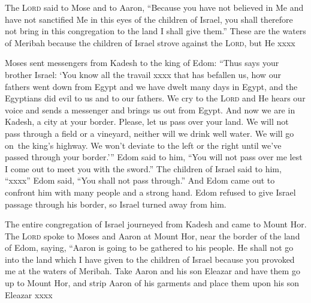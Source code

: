 \begin{inparaenum}
     The \textsc{Lord} said to Mose and to Aaron, ``Because you have not believed in Me and have not sanctified Me in this eyes of the children of Israel, you shall therefore not bring in this congregation to the land I shall give them.''%
     These are the waters of Meribah because the children of Israel strove against the \textsc{Lord}, but He xxxx%
    
     Moses sent messengers from Kadesh to the king of Edom: ``Thus says your brother Israel: `You know all the travail xxxx that has befallen us,%
     how our fathers went down from Egypt and we have dwelt many days in Egypt, and the Egyptians did evil to us and to our fathers.%
     We cry to the \textsc{Lord} and He hears our voice and sends a messenger and brings us out from Egypt. And now we are in Kadesh, a city at your border.%
     Please, let us pass over your land. We will not pass through a field or a vineyard, neither will we drink well water. We will go on\understood\ the king's highway. We won't deviate to the left or the right until we've passed through your border.'\thinspace''%
     Edom said to him, ``You will not pass over me lest I come out to meet you with the sword.''%
     The children of Israel said to him, ``xxxx''%
     Edom said, ``You shall not pass through.'' And Edom came out to confront him with many people and a strong hand.%
     Edom refused to give Israel passage through his border, so Israel turned away from him.%
    
     The entire congregation of Israel journeyed from Kadesh and came to Mount Hor.%
     The \textsc{Lord} spoke to Moses and Aaron at Mount Hor, near the border of the land of Edom, saying,%
     ``Aaron is going to be gathered to his people. He shall not go into the land which I have given to the children of Israel because you provoked me at the waters of Meribah.%
     Take Aaron and his son Eleazar and have them go up to Mount Hor,
     and strip Aaron of his garments and place them upon his son Eleazar xxxx%
\end{inparaenum}
